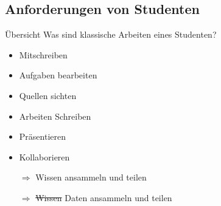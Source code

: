 \subsection{Anforderungen von Studenten}
\begin{frame}{Übersicht}
Was sind klassische Arbeiten eines Studenten?
    \begin{itemize}
        \item Mitschreiben 
        \item Aufgaben bearbeiten
        \item Quellen sichten
        \item Arbeiten Schreiben
        \item Präsentieren
        \item Kollaborieren\pause
        \item[$\Rightarrow$] Wissen ansammeln und teilen  \pause
        \item[$\Rightarrow$] \sout{Wissen} Daten ansammeln und teilen   
    \end{itemize}
\end{frame}


